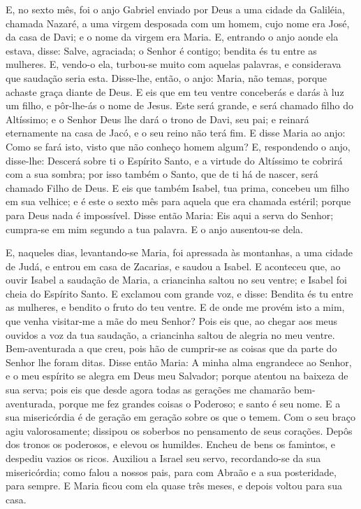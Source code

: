 E, no sexto mês, foi o anjo Gabriel enviado por Deus a uma cidade
da Galiléia, chamada Nazaré, a uma virgem desposada com um
homem, cujo nome era José, da casa de Davi; e o nome da virgem era
Maria. E, entrando o anjo aonde ela estava, disse: Salve,
agraciada; o Senhor é contigo; bendita és tu entre as mulheres.
E, vendo-o ela, turbou-se muito com aquelas palavras, e
considerava que saudação seria esta. Disse-lhe, então, o
anjo: Maria, não temas, porque achaste graça diante de Deus.
E eis que em teu ventre conceberás e darás à luz um filho, e
pôr-lhe-ás o nome de Jesus. Este será grande, e será chamado
filho do Altíssimo; e o Senhor Deus lhe dará o trono de Davi, seu
pai; e reinará eternamente na casa de Jacó, e o seu reino não
terá fim. E disse Maria ao anjo: Como se fará isto, visto que
não conheço homem algum? E, respondendo o anjo, disse-lhe:
Descerá sobre ti o Espírito Santo, e a virtude do Altíssimo te
cobrirá com a sua sombra; por isso também o Santo, que de ti há de
nascer, será chamado Filho de Deus. E eis que também Isabel,
tua prima, concebeu um filho em sua velhice; e é este o sexto mês
para aquela que era chamada estéril; porque para Deus nada é
impossível. Disse então Maria: Eis aqui a serva do Senhor;
cumpra-se em mim segundo a tua palavra. E o anjo ausentou-se dela.

E, naqueles dias, levantando-se Maria, foi apressada às
montanhas, a uma cidade de Judá, e entrou em casa de
Zacarias, e saudou a Isabel. E aconteceu que, ao ouvir Isabel
a saudação de Maria, a criancinha saltou no seu ventre; e Isabel foi
cheia do Espírito Santo. E exclamou com grande voz, e disse:
Bendita és tu entre as mulheres, e bendito o fruto do teu ventre.
E de onde me provém isto a mim, que venha visitar-me a mãe do
meu Senhor? Pois eis que, ao chegar aos meus ouvidos a voz da
tua saudação, a criancinha saltou de alegria no meu ventre.
Bem-aventurada a que creu, pois hão de cumprir-se as coisas
que da parte do Senhor lhe foram ditas. Disse então Maria: A
minha alma engrandece ao Senhor, e o meu espírito se alegra
em Deus meu Salvador; porque atentou na baixeza de sua serva;
pois eis que desde agora todas as gerações me chamarão
bem-aventurada, porque me fez grandes coisas o Poderoso; e
santo é seu nome. E a sua misericórdia é de geração em
geração sobre os que o temem. Com o seu braço agiu
valorosamente; dissipou os soberbos no pensamento de seus corações.
Depôs dos tronos os poderosos, e elevou os humildes.
Encheu de bens os famintos, e despediu vazios os ricos.
Auxiliou a Israel seu servo, recordando-se da sua
misericórdia; como falou a nossos pais, para com Abraão e a
sua posteridade, para sempre. E Maria ficou com ela quase
três meses, e depois voltou para sua casa.

